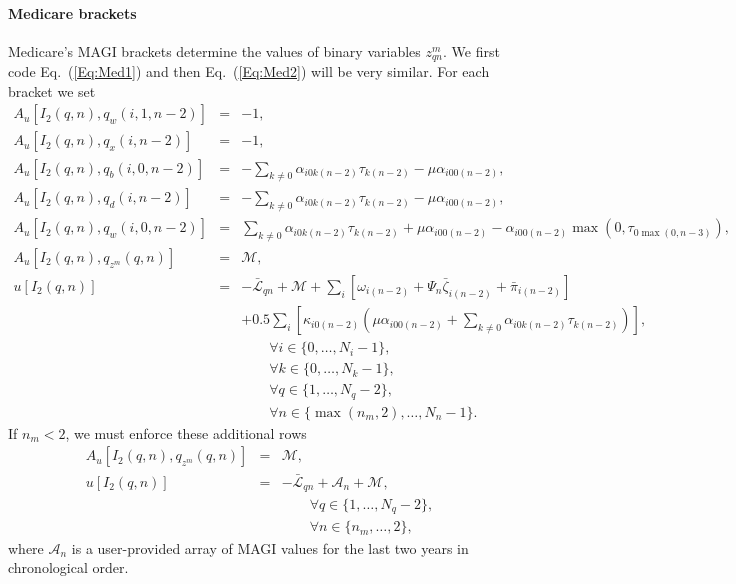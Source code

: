 \documentclass{report}[fleqn,11pt]
\begin{document}
\paragraph*{Medicare brackets}
Medicare's MAGI brackets determine the values of binary variables $z^m_{qn}$.
We first code Eq.~(\ref{Eq:Med1}) and then Eq.~(\ref{Eq:Med2}) will be very similar.
For each bracket we set
\begin{eqnarray}
	A_u[I_2(q, n), q_{w}(i, 1, n-2)] &=& -1, \nonumber \\
	A_u[I_2(q, n), q_{x}(i, n-2)] &=& -1, \nonumber \\
	A_u[I_2(q, n), q_{b}(i, 0, n-2)] &=&
	    -\sum_{k\neq 0} \alpha_{i0k(n-2)}\tau_{k(n-2)} - \mu \alpha_{i00(n-2)},
	    \nonumber \\
	A_u[I_2(q, n), q_{d}(i, n-2)] &=&
	    -\sum_{k\neq 0} \alpha_{i0k(n-2)}\tau_{k(n-2)} - \mu \alpha_{i00(n-2)},
	    \nonumber \\
	A_u[I_2(q, n), q_{w}(i, 0, n-2)] &=&
	    \sum_{k\neq 0} \alpha_{i0k(n-2)}\tau_{k(n-2)} + \mu \alpha_{i00(n-2)}
	    - \alpha_{i00(n-2)}\max(0, \tau_{0\max(0, n-3)}), \nonumber \\
	A_u[I_2(q, n), q_{z^m}(q, n)] &=& \mathcal{M}, \nonumber \\
	u[I_2(q, n)] &=& -\bar{\mathcal{L}}_{qn} + \mathcal{M}
         + \sum_i \left[\omega_{i(n-2)} + \Psi_n\bar{\zeta}_{i(n-2)} + \bar{\pi}_{i(n-2)} \right]\nonumber \\
	&& + 0.5 \sum_i \left[\kappa_{i0(n-2)}  \left(
	  \mu\alpha_{i00(n-2)} + \sum_{k\neq 0} \alpha_{i0k(n-2)}\tau_{k(n-2)}
	  \right)\right],\nonumber\\
	&&\qquad\forall i \in \{0,\ldots, N_i - 1\}, \nonumber\\
	&&\qquad\forall k \in \{0,\ldots, N_k - 1\}, \nonumber\\
	&&\qquad\forall q \in \{1,\ldots, N_q - 2\}, \nonumber\\
	&&\qquad\forall n \in \{\max(n_m, 2),\ldots, N_n - 1\}.
\end{eqnarray}
If $n_m < 2$, we must enforce these additional rows
\begin{eqnarray}
	A_u[I_2(q, n), q_{z^m}(q, n)] &=& \mathcal{M}, \nonumber \\
	u[I_2(q, n)] &=& -\bar{\mathcal{L}}_{qn} + \mathcal{A}_{n} + \mathcal{M}, \nonumber \\
	&&\qquad\forall q \in \{1,\ldots, N_q - 2\}, \nonumber\\
	&&\qquad\forall n \in \{n_m,\ldots, 2\},
\end{eqnarray}
where $\mathcal{A}_n$ is a user-provided array of MAGI values for the last two years in chronological order.
\end{document}

